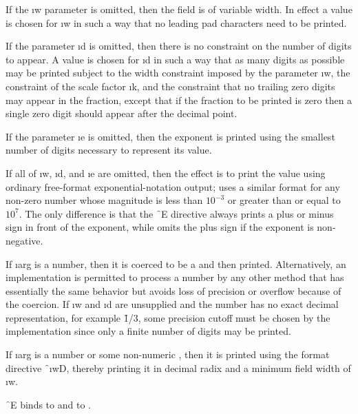 If the \i{w} parameter is omitted, then the field is of variable width.
In effect a value is chosen
for \i{w} in such a way that no leading pad characters need to be printed.

If the parameter \i{d} is omitted, then there is no constraint
on the number of digits to appear.
A value is chosen for \i{d} in such a way that as many digits
as possible may be printed subject to the width constraint
imposed by the parameter \i{w}, the constraint of the scale factor \i{k},
and the constraint that no trailing
zero digits may appear in the fraction, except that if the
fraction to be printed is zero then a single zero digit should
appear after the decimal point.

If the parameter \i{e} is omitted, then the exponent is printed
using the smallest number of digits necessary to represent its value.

If all of \i{w}, \i{d}, and \i{e} are omitted, then the effect is to print
the value using ordinary free-format exponential-notation output;
 uses 
a similar
format for any non-zero number whose magnitude
is less than $10^{-3}$ or greater than or equal to $10^7$.
The only difference is that the \f{~E} 
directive always prints a plus or minus sign in front of the
    exponent, while  omits the plus sign if the exponent is
    non-negative.

If \i{arg} is a  
number, then it is coerced to be a 
and then printed.  Alternatively, an implementation is permitted to
process a  
number by any other method that has essentially the
same behavior but avoids loss of precision or overflow
because of the coercion.  If \i{w} and \i{d} are
unsupplied and the number has no exact decimal representation,
for example \f{1/3}, some precision cutoff must be chosen
by the implementation since only a finite number of digits may be printed.

If \i{arg} is a  number or some non-numeric
, 
then it is printed using the format directive \f{~\i{w}D},
thereby printing it in decimal radix and a minimum field width of \i{w}.

\f{~E} binds
      to 
 and  to .

